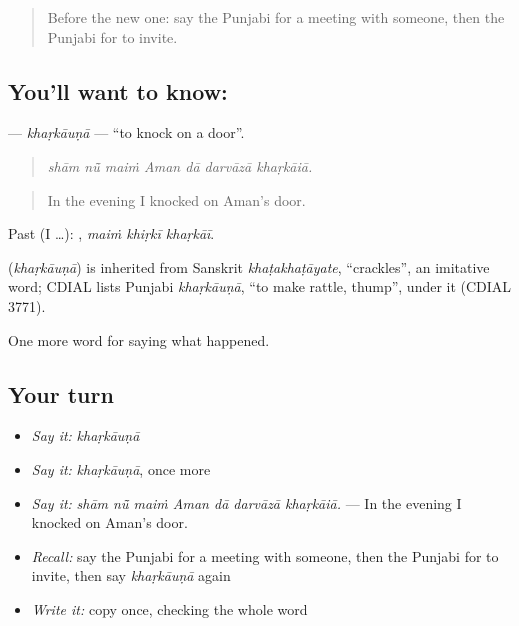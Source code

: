 \begin{quote}
Before the new one: say the Punjabi for a meeting with someone, then the Punjabi for to invite.
\end{quote}

\subsection*{You'll want to know: }
\textbf{} — \emph{khaṛkāuṇā} — \textquotedblleft{}to knock on a door\textquotedblright{}.

\begin{quote}
      
\end{quote}

\begin{quote}
\emph{shām nū̃ maiṁ Aman dā darvāzā khaṛkāiā.}
\end{quote}

\begin{quote}
In the evening I knocked on Aman's door.
\end{quote}

Past (I …):   , \emph{maiṁ khiṛkī khaṛkāī}.

\begin{cousinweb}
\textbf{} (\emph{khaṛkāuṇā}) is inherited from Sanskrit \emph{khaṭakhaṭāyate}, \textquotedblleft{}crackles\textquotedblright{}, an imitative word; CDIAL lists Punjabi \emph{khaṛkāuṇā}, \textquotedblleft{}to make rattle, thump\textquotedblright{}, under it (CDIAL 3771).
\end{cousinweb}

\begin{grammarlens}[title={What you've built}]
One more word for saying what happened.
\end{grammarlens}

\subsection*{Your turn}
\begin{itemize}
\raggedright
  \item \emph{Say it:} \emph{khaṛkāuṇā}
  \item \emph{Say it:} \emph{khaṛkāuṇā}, once more
  \item \emph{Say it:} \emph{shām nū̃ maiṁ Aman dā darvāzā khaṛkāiā.} — In the evening I knocked on Aman's door.
  \item \emph{Recall:} say the Punjabi for a meeting with someone, then the Punjabi for to invite, then say \emph{khaṛkāuṇā} again
  \item \emph{Write it:} copy \textbf{} once, checking the whole word
\end{itemize}

